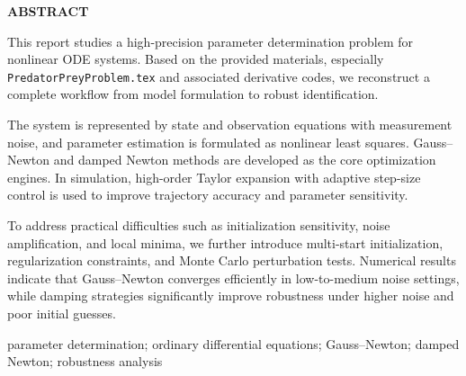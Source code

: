 \thispagestyle{plain}
{}
\centerline{\bfseries ABSTRACT}

\linespread{1.3}\bigskip

This report studies a high-precision parameter determination problem for nonlinear ODE systems. Based on the provided materials, especially \texttt{PredatorPreyProblem.tex} and associated derivative codes, we reconstruct a complete workflow from model formulation to robust identification.

The system is represented by state and observation equations with measurement noise, and parameter estimation is formulated as nonlinear least squares. Gauss--Newton and damped Newton methods are developed as the core optimization engines. In simulation, high-order Taylor expansion with adaptive step-size control is used to improve trajectory accuracy and parameter sensitivity.

To address practical difficulties such as initialization sensitivity, noise amplification, and local minima, we further introduce multi-start initialization, regularization constraints, and Monte Carlo perturbation tests. Numerical results indicate that Gauss--Newton converges efficiently in low-to-medium noise settings, while damping strategies significantly improve robustness under higher noise and poor initial guesses.

\bigskip
{}
parameter determination; ordinary differential equations; Gauss--Newton; damped Newton; robustness analysis
